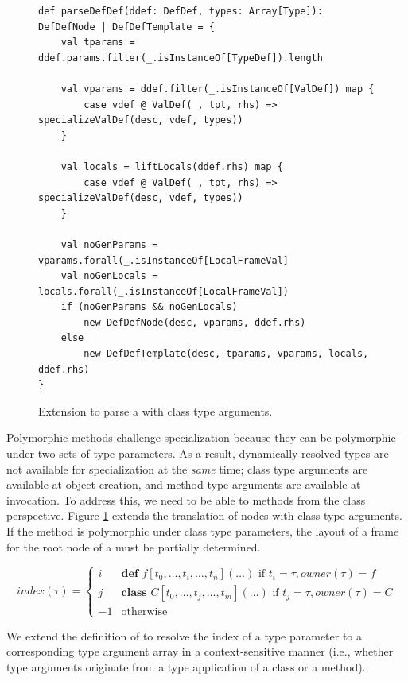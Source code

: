 \begin{figure}[!htb]
\begin{verbatim}
def parseDefDef(ddef: DefDef, types: Array[Type]): DefDefNode | DefDefTemplate = {
	val tparams = ddef.params.filter(_.isInstanceOf[TypeDef]).length
	
	val vparams = ddef.filter(_.isInstanceOf[ValDef]) map {
		case vdef @ ValDef(_, tpt, rhs) => specializeValDef(desc, vdef, types))
	}

	val locals = liftLocals(ddef.rhs) map {
		case vdef @ ValDef(_, tpt, rhs) => specializeValDef(desc, vdef, types))
	}
	
	val noGenParams = vparams.forall(_.isInstanceOf[LocalFrameVal]
	val noGenLocals = locals.forall(_.isInstanceOf[LocalFrameVal])
	if (noGenParams && noGenLocals)
		new DefDefNode(desc, vparams, ddef.rhs)
	else 
		new DefDefTemplate(desc, tparams, vparams, locals, ddef.rhs)
}
\end{verbatim}
\caption{Extension to parse a  with class type arguments.}
\label{impl:parse-poly-defdef-cls}
\end{figure}

Polymorphic methods challenge specialization because they can be polymorphic under two sets of type parameters.
As a result, dynamically resolved types are not available for specialization at the \textit{same} time; class type arguments are available at object creation, and method type arguments are available at invocation.
To address this, we need to be able to  methods from the class perspective.
Figure \ref{impl:parse-poly-defdef-cls} extends the translation of  nodes with class type arguments.
If the method is polymorphic under class type parameters, the layout of a frame for the root node of a  must be partially determined.

$$
index(\tau) = 
\begin{cases}
	i  & \textbf{def } f[t_0, \ldots, t_i, \ldots, t_n](\ldots) \text{ if } t_i = \tau, owner(\tau)=f \\
	j  & \textbf{class } C[t_0, \ldots, t_j, \ldots, t_m](\ldots) \text{ if } t_j = \tau, owner(\tau)=C \\
	-1 & \text{otherwise}
\end{cases}
$$

We extend the definition of  to resolve the index of a type parameter to a corresponding type argument array in a context-sensitive manner (i.e., whether type arguments originate from a type application of a class or a method).

